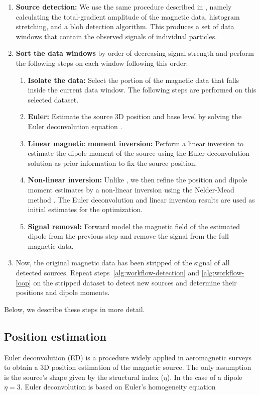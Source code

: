 \begin{enumerate}
    \item \textbf{Source detection:} We use the same procedure described in \citet{Souza-Junior2024}, namely calculating the total-gradient amplitude of the magnetic data, histogram stretching, and a blob detection algorithm. This produces a set of data windows that contain the observed signals of individual particles. 
    \label{alg:workflow-detection}
    \item \textbf{Sort the data windows} by order of decreasing signal strength and perform the following steps on each window following this order:
    \label{alg:workflow-loop}
    \begin{enumerate}
        \item \textbf{Isolate the data:} Select the portion of the magnetic data that falls inside the current data window. The following steps are performed on this selected dataset.
        \item \textbf{Euler:} Estimate the source 3D position and base level by solving the Euler deconvolution equation \citep{Reid1990}.
        \item \textbf{Linear magnetic moment inversion:} Perform a linear inversion to estimate the dipole moment of the source using the Euler deconvolution solution as prior information to fix the source position.
        \item \textbf{Non-linear inversion:} Unlike \citet{Souza-Junior2024}, we then refine the position and dipole moment estimates by a non-linear inversion using the Nelder-Mead method \citep{Nelder-Mead1965,Gao2010}. The Euler deconvolution and linear inversion results are used as initial estimates for the optimization.
        \item \textbf{Signal removal:} Forward model the magnetic field of the estimated dipole from the previous step and remove the signal from the full magnetic data. 
    \end{enumerate}
    \item Now, the original magnetic data has been stripped of the signal of all detected sources. Repeat steps~\ref{alg:workflow-detection} and \ref{alg:workflow-loop} on the stripped dataset to detect new sources and determine their positions and dipole moments.
\end{enumerate}

\noindent
Below, we describe these steps in more detail.

\subsection{Position estimation}
    Euler deconvolution (ED) \citep{Reid1990} is a procedure widely applied in aeromagnetic surveys \citep{Barbosa2011, Melo2013} to obtain a 3D position estimation of the magnetic source. The only assumption is the source's shape given by the structural index ($\eta$).
    In the case of a dipole $\eta = 3$. Euler deconvolution is based on Euler's homogeneity equation
    
